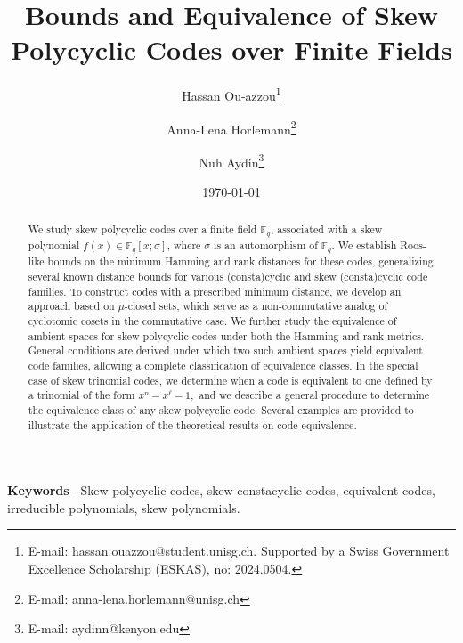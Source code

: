 \documentclass[12pt,paper]{article}
\title{\textbf{Bounds and Equivalence of Skew Polycyclic Codes over Finite Fields}}
\author[1]{Hassan  Ou-azzou\thanks{E-mail: \rm{hassan.ouazzou@student.unisg.ch}. Supported by a Swiss Government Excellence Scholarship (ESKAS), no:  2024.0504.}}
\author[2]{Anna-Lena Horlemann\thanks{E-mail: \rm{anna-lena.horlemann@unisg.ch}}}
\author[3]{Nuh Aydin\thanks{E-mail: \rm{aydinn@kenyon.edu}}}
\affil[1,2]{School of Computer Science, University of St.Gallen, 9000 St.\ Gallen, Switzerland}
\affil[3]{Department of Mathematics and Statistics, Kenyon College, Gambier, OH 43022, USA}
\date{ \today}
\providecommand{\keywords}[1]
{
  {\small	
  \textbf{{Keywords--}} #1}
}
\theoremstyle{plain}
\begin{document}
	
	
	\maketitle
    
    \begin{abstract}

    We study skew polycyclic codes over a finite field $\mathbb{F}_q$, associated with a skew polynomial $f(x) \in \mathbb{F}_q[x;\sigma]$, where $\sigma$ is an automorphism of $\mathbb{F}_q$.  We establish Roos-like bounds on the minimum Hamming and rank distances for these codes, generalizing several known distance bounds for various (consta)cyclic and skew (consta)cyclic code families. To construct codes with a prescribed minimum distance, we develop an approach based on $\mu$-closed sets, which serve as a non-commutative analog of cyclotomic cosets in the commutative case. We further study the equivalence of ambient spaces for skew polycyclic codes under both the Hamming and rank metrics. General conditions are derived under which two such ambient spaces yield equivalent code families, allowing a complete classification of equivalence classes. In the special case of skew trinomial codes, we determine when a code is equivalent to one defined by a trinomial of the form $x^n-x^{\ell}-1,$ and we describe a general procedure to determine the equivalence class of any skew polycyclic code. Several examples are provided to illustrate the application of the theoretical results on code equivalence.
    




\end{abstract}
   \keywords{Skew polycyclic codes,   skew  constacyclic codes, equivalent codes, irreducible polynomials, skew polynomials.}


  		
        		        	
\end{document}
